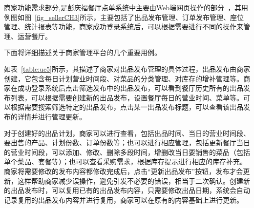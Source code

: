 商家功能需求部分,是彭庆福餐厅点单系统中主要由Web端网页操作的部分~\cite{yzl2017}，其用例图如图~\ref{fig_sellerCH3}所示，主要包括了出品发布管理、订单发布管理、座位管理、统计报表等功能，商家成功登录系统后，可以根据需要进行不同的操作来管理、运营餐厅。

下面将详细描述关于商家管理平台的几个重要用例。

如表~\ref{table:uc5}所示，其描述了商家对出品发布管理的具体过程，出品发布由商家创建，它包含每日计划营业时间段、对菜品的分类管理、对库存的增补管理等。商家在成功登录系统后点击筛选发布中的出品发布，可以看到餐厅历史所有的出品发布列表，可以根据需要创建新的出品发布，设置餐厅每日的营业时间、菜单等。可以根据需要搜索筛选特定的出品发布，点击某一出品发布标题，可以查看该出品发布的详情并进行管理更新。

对于创建好的出品计划，商家可以进行查看，包括出品时间、当日的营业时间段、要出售的产品、计划份数、订单份数等；也可以进行相应管理，包括更新餐厅当日的营业时间段，可以添加、修改、删除多段时间，增删改当日要销售的菜品（包括单个菜品、套餐等）；也可以查看采购需求，根据库存提示进行相应的库存补充。商家将需要修改的发布内容都修改完成后，点击“更新出品发布”按钮，发布才会更新，这样帮助商家减少误操作，避免引发不必要的错误，相当于二次确认。创建新的出品发布时，可以复用已有的出品发布内容，只需要修改出品日期，系统会自动记录复用的出品发布内容并进行复用，商家可以在原有的内容基础上进行更新。

